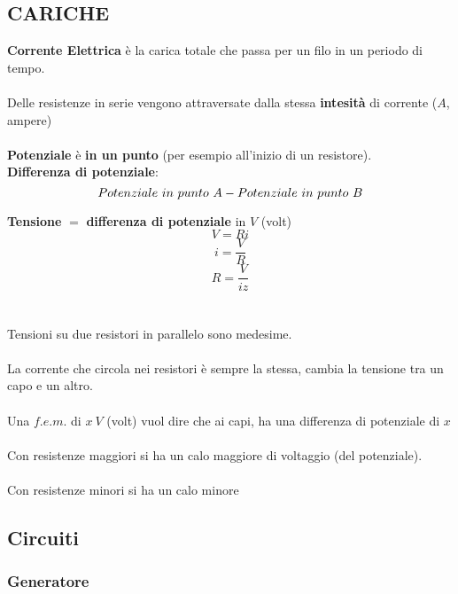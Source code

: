 \documentclass{article}
\begin{document}
\subsection{CARICHE}

\textbf{Corrente Elettrica} è la carica totale che passa per un filo in un periodo di tempo.
\\\\
Delle resistenze in serie vengono attraversate dalla stessa \textbf{intesità} di corrente ($A$, ampere)
\\\\
\textbf{Potenziale} è \textbf{in un punto} (per esempio all'inizio di un resistore).\\

\textbf{Differenza di potenziale}:
\begin{equation*}
  Potenziale\ in\ punto\ A - Potenziale\ in\ punto\ B\\
\end{equation*}

\textbf{Tensione} $=$ \textbf{differenza di potenziale} in $V$ (volt)
\begin{equation*}
  V=Ri
\end{equation*}
\begin{equation*}
    i=\frac{V}{R}
\end{equation*}
\begin{equation*}
  R=\frac{V}{iz}
\end{equation*}
\\\\
Tensioni su due resistori in parallelo sono medesime.
\\\\
La corrente che circola nei resistori è sempre la stessa, cambia la tensione tra un capo e un altro.
\\\\
Una $f.e.m.$ di $x\ V$ (volt) vuol dire che ai capi, ha una differenza di potenziale di $x$
\\\\
Con resistenze maggiori si ha un calo maggiore di voltaggio (del potenziale).
\\\\
Con resistenze minori si ha un calo minore

\subsection{Circuiti}
\subsubsection{Generatore}
\end{document}
